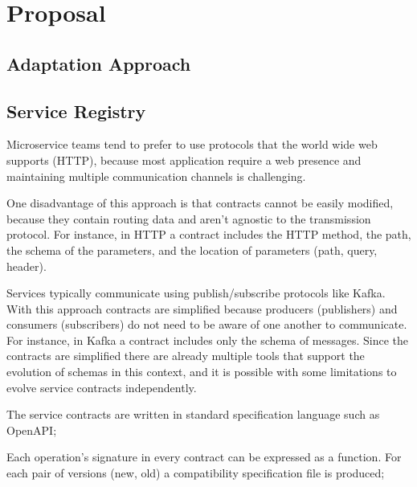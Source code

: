 
%

\chapter{Proposal}
\label{cha:proposal}

\section{Adaptation Approach} %
\label{sec:adaptation_approach}

\section{Service Registry} %
\label{sec:service_registry}

Microservice teams tend to prefer to use protocols that the world wide web supports (HTTP),
because most application require a web presence and maintaining multiple communication channels is challenging.

One disadvantage of this approach is that contracts cannot be easily modified, because they contain routing data and aren't agnostic to the transmission protocol.
For instance, in HTTP a contract includes the HTTP method, the path, the schema of the parameters, and the location of parameters (path, query, header).

Services typically communicate using publish/subscribe protocols like Kafka.
With this approach contracts are simplified because producers (publishers) and consumers (subscribers) do not need to be aware of one another to communicate.
For instance, in Kafka a contract includes only the schema of messages.
Since the contracts are simplified there are already multiple tools that support the evolution of schemas in this context,
and it is possible with some limitations to evolve service contracts independently.

The service contracts are written in standard specification language such as OpenAPI;

Each operation's signature in every contract can be expressed as a function.
For each pair of versions (new, old) a compatibility specification file is produced;

